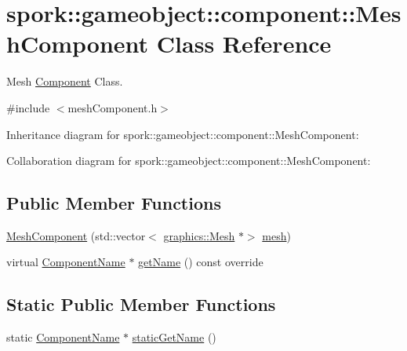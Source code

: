 \hypertarget{classspork_1_1gameobject_1_1component_1_1_mesh_component}{}\section{spork\+:\+:gameobject\+:\+:component\+:\+:Mesh\+Component Class Reference}
\label{classspork_1_1gameobject_1_1component_1_1_mesh_component}


Mesh \hyperlink{classspork_1_1gameobject_1_1component_1_1_component}{Component} Class.  




{\ttfamily \#include $<$mesh\+Component.\+h$>$}



Inheritance diagram for spork\+:\+:gameobject\+:\+:component\+:\+:Mesh\+Component\+:


Collaboration diagram for spork\+:\+:gameobject\+:\+:component\+:\+:Mesh\+Component\+:
\subsection*{Public Member Functions}
\begin{DoxyCompactItemize}
\item 
\hyperlink{classspork_1_1gameobject_1_1component_1_1_mesh_component_ad4f541e517f9c2a7a252f7b5d6d42766}{Mesh\+Component} (std\+::vector$<$ \hyperlink{classspork_1_1graphics_1_1_mesh}{graphics\+::\+Mesh} $\ast$$>$ \hyperlink{classspork_1_1gameobject_1_1component_1_1_mesh_component_a7d59263e36ff884bc0e8dc50bab78871}{mesh})
\item 
virtual \hyperlink{structspork_1_1gameobject_1_1component_1_1_component_name}{Component\+Name} $\ast$ \hyperlink{classspork_1_1gameobject_1_1component_1_1_mesh_component_ac415c0ccc8938827b3f450c15a79d1b0}{get\+Name} () const override
\end{DoxyCompactItemize}
\subsection*{Static Public Member Functions}
\begin{DoxyCompactItemize}
\item 
static \hyperlink{structspork_1_1gameobject_1_1component_1_1_component_name}{Component\+Name} $\ast$ \hyperlink{classspork_1_1gameobject_1_1component_1_1_mesh_component_a9505bda8af35f17c9038f54d2c3d485d}{static\+Get\+Name} ()
\end{DoxyCompactItemize}
